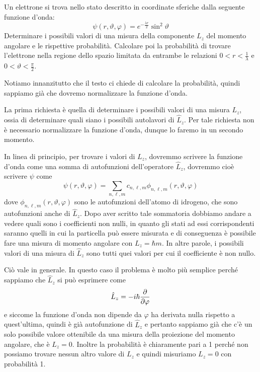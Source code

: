 \begin{esercizio}[(14/09/2020 n°1)]
   Un elettrone si trova nello stato descritto in coordinate
   sferiche dalla seguente funzione d'onda:
   \begin{equation*}
      \psi(r,\vartheta,\varphi)=e^{-\frac{\lambda r}{2}} \sin^2{\vartheta}
   \end{equation*}
   Determinare i possibili valori di una misura della componente $L_z$ del momento angolare e le rispettive probabilità. Calcolare poi la probabilità di trovare l'elettrone nella regione dello spazio limitata da entrambe le relazioni $0<r<\frac{1}{\lambda}$ e $0<\vartheta<\frac{\pi}{2}$.
\end{esercizio}
\begin{soluzione}
   Notiamo innanzitutto che il testo ci chiede di calcolare la probabilità, quindi sappiamo già che dovremo normalizzare la funzione d'onda.
   
   La prima richiesta è quella di determinare i possibili valori di una misura $L_z$, ossia di determinare quali siano i possibili autolavori di $\hat{L}_z$. Per tale richiesta non è necessario normalizzare la funzione d'onda, dunque lo faremo in un secondo momento.
   
   In linea di principio, per trovare i valori di $L_z$, dovremmo scrivere la funzione d'onda come una somma di autofunzioni dell'operatore $\hat{L}_z$, dovremmo cioè scrivere $\psi$ come
   \begin{equation*}
      \psi(r,\vartheta,\varphi)=\sum_{n,\ell,m} c_{n,\ell,m} \phi_{n,\ell,m}(r,\vartheta,\varphi)
   \end{equation*}
   dove $\phi_{n,\ell,m}(r,\vartheta,\varphi)$ sono le autofunzioni dell'atomo di idrogeno, che sono autofunzioni anche di $\hat{L}_z$. Dopo aver scritto tale sommatoria dobbiamo andare a vedere quali sono i coefficienti non nulli, in quanto gli stati ad essi corrispondenti saranno quelli in cui la particella può essere misurata e di conseguenza è possibile fare una misura di momento angolare con $L_z=\hbar m$. In altre parole, i possibili valori di una misura di $\hat{L}_z$ sono tutti quei valori per cui il coefficiente è non nullo.

   Ciò vale in generale. In questo caso il problema è molto più semplice perché sappiamo che $\hat{L}_z$ si può esprimere come
   \begin{equation*}
      \hat{L}_z=-i\hbar \pdv{\varphi}
   \end{equation*}
   e siccome la funzione d'onda non dipende da $\varphi$ ha derivata nulla rispetto a quest'ultima, quindi è già autofunzione di $\hat{L}_z$ e pertanto sappiamo già che c'è un solo possibile valore ottenibile da una misura della proiezione del momento angolare, che è $L_z=0$. Inoltre la probabilità è chiaramente pari a 1 perché non possiamo trovare nessun altro valore di $L_z$ e quindi misuriamo $L_z=0$ con probabilità 1.
   

\end{soluzione}
